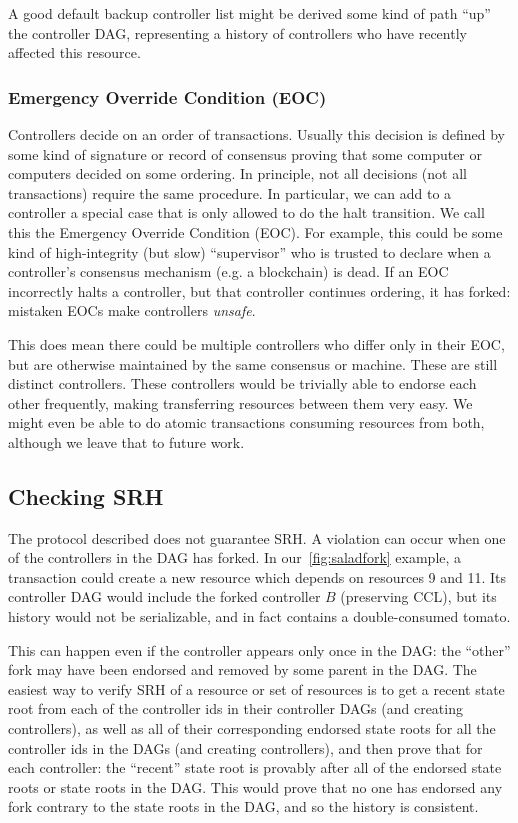 \documentclass[a4paper,USenglish,cleveref, autoref, thm-restate, anonymous]{lipics-v2021}
\begin{document}
A good default backup controller list might be derived some kind of path ``up'' the controller DAG, representing a history of controllers who have recently affected this resource. 

\subsubsection{Emergency Override Condition (EOC)}
Controllers decide on an order of transactions.
Usually this decision is defined by some kind of signature or record of consensus proving that some computer or computers decided on some ordering.
In principle, not all decisions (not all transactions) require the same procedure.
In particular, we can add to a controller a special case that is only allowed to do the halt transition.
We call this the Emergency Override Condition (EOC). 
For example, this could be some kind of high-integrity (but slow) ``supervisor'' who is trusted to declare when a controller's consensus mechanism (e.g. a blockchain) is dead.
If an EOC incorrectly halts a controller, but that controller continues ordering, it has forked: mistaken EOCs make controllers \emph{unsafe}. 

This does mean there could be multiple controllers who differ only in their EOC, but are otherwise maintained by the same consensus or machine.
These are still distinct controllers.
These controllers would be trivially able to endorse each other frequently, making transferring resources between them very easy. 
We might even be able to do atomic transactions consuming resources from both, although we leave that to future work. 



\subsection{Checking SRH}
The protocol described does not guarantee SRH.
A violation can occur when one of the controllers in the DAG has forked.
In our~\cref{fig:saladfork} example, a transaction could create a new resource which depends on resources 9 and 11.
Its controller DAG would include the forked controller $B$ (preserving CCL), but its history would not be serializable, and in fact contains a double-consumed tomato.

This can happen even if the controller appears only once in the DAG: the ``other'' fork may have been endorsed and removed by some parent in the DAG.
The easiest way to verify SRH of a resource or set of resources is to get a recent state root from each of the controller ids in their controller DAGs (and creating controllers), as well as all of their corresponding endorsed state roots for all the controller ids in the DAGs (and creating controllers), and then prove that for each controller: the ``recent'' state root is provably after all of the endorsed state roots or state roots in the DAG.
This would prove that no one has endorsed any fork contrary to the state roots in the DAG, and so the history is consistent. 
\end{document}
